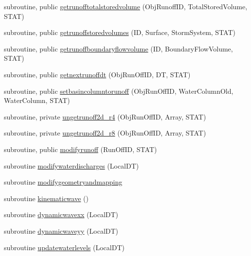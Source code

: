 \begin{DoxyCompactItemize}
\item 
subroutine, public \mbox{\hyperlink{namespacemodulerunoff_aa890e5ad105516c116e7c4f53b656bfb}{getrunofftotalstoredvolume}} (Obj\+Runoff\+ID, Total\+Stored\+Volume, S\+T\+AT)
\item 
subroutine, public \mbox{\hyperlink{namespacemodulerunoff_a9d8c0b3cb553adb36c76cde2d6bcaef7}{getrunoffstoredvolumes}} (ID, Surface, Storm\+System, S\+T\+AT)
\item 
subroutine, public \mbox{\hyperlink{namespacemodulerunoff_a3a9224ad169d37f7fdb8eb535513d1b1}{getrunoffboundaryflowvolume}} (ID, Boundary\+Flow\+Volume, S\+T\+AT)
\item 
subroutine, public \mbox{\hyperlink{namespacemodulerunoff_a364cfd3bda8ba61cda13d20f848f20dc}{getnextrunoffdt}} (Obj\+Run\+Off\+ID, DT, S\+T\+AT)
\item 
subroutine, public \mbox{\hyperlink{namespacemodulerunoff_a1bdc99360bd152034690c7eed836b2cf}{setbasincolumntorunoff}} (Obj\+Run\+Off\+ID, Water\+Column\+Old, Water\+Column, S\+T\+AT)
\item 
subroutine, private \mbox{\hyperlink{namespacemodulerunoff_acd023a67da604bbfb903587e80244138}{ungetrunoff2d\+\_\+r4}} (Obj\+Run\+Off\+ID, Array, S\+T\+AT)
\item 
subroutine, private \mbox{\hyperlink{namespacemodulerunoff_af00779fc9a81a3cdf2947f1c7990d1c8}{ungetrunoff2d\+\_\+r8}} (Obj\+Run\+Off\+ID, Array, S\+T\+AT)
\item 
subroutine, public \mbox{\hyperlink{namespacemodulerunoff_a43ce9e041625ab643d74cc279ddf43db}{modifyrunoff}} (Run\+Off\+ID, S\+T\+AT)
\item 
subroutine \mbox{\hyperlink{namespacemodulerunoff_aadda9f593eae7a9fbebc7ae31f4e847b}{modifywaterdischarges}} (Local\+DT)
\item 
subroutine \mbox{\hyperlink{namespacemodulerunoff_a5ae3563ef43601cbe338d999deca7e2b}{modifygeometryandmapping}}
\item 
subroutine \mbox{\hyperlink{namespacemodulerunoff_ac9ce40d4e0d4a7a1faa6f0a7fd6eca2f}{kinematicwave}} ()
\item 
subroutine \mbox{\hyperlink{namespacemodulerunoff_a18db45ec88a4cf69a97c7b95648bc264}{dynamicwavexx}} (Local\+DT)
\item 
subroutine \mbox{\hyperlink{namespacemodulerunoff_a86d4b0ce5f4e6efc7d53702b40d97604}{dynamicwaveyy}} (Local\+DT)
\item 
subroutine \mbox{\hyperlink{namespacemodulerunoff_ae21623961ce63cf7c148437e7ad9d934}{updatewaterlevels}} (Local\+DT)

\end{DoxyCompactItemize}
